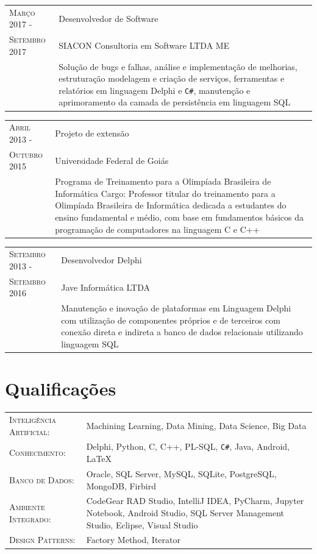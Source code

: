 \documentclass[12pt, oneside, openany, a4paper, english, brazil]{abntex2}
\begin{document}
\begin{tabular}{p{3.5cm}p{11cm}}
\textsc{Março 2017} - & Desenvolvedor de Software \\
\textsc{Setembro 2017} & SIACON Consultoria em Software LTDA ME \\ 
\textsc{} & Solução de bugs e falhas, análise e implementação de melhorias, estruturação modelagem e criação de serviços, ferramentas e relatórios em linguagem Delphi e \texttt{C\#}, manutenção e aprimoramento da camada de persistência em linguagem SQL
\end{tabular}                                    

\begin{tabular}{p{3.5cm}p{11cm}}
\textsc{Abril 2013} - & Projeto de extensão \\
\textsc{Outubro 2015} & Universidade Federal de Goiás \\
\textsc{} & Programa de Treinamento para a Olimpíada Brasileira de Informática Cargo: Professor titular do treinamento para a Olimpíada Brasileira de Informática dedicada a estudantes do ensino fundamental e médio, com base em fundamentos básicos da programação de computadores na linguagem C e C++
\end{tabular}

\begin{tabular}{p{3.5cm}p{11cm}}
\textsc{Setembro 2013} - & Desenvolvedor Delphi \\
\textsc{Setembro 2016} & Jave Informática LTDA \\ 
\textsc{} & Manutenção e inovação de plataformas em Linguagem Delphi com utilização de componentes próprios e de terceiros com conexão direta e indireta a banco de dados relacionais utilizando linguagem SQL
\end{tabular}


\section{Qualificações}


\begin{tabular}{p{5.5cm}p{9cm}}
\textsc{Inteligência Artificial:} & Machining Learning, Data Mining, Data Science, Big Data \\
\textsc{Conhecimento:} & Delphi, Python, C, C++, PL-SQL, \texttt{C\#}, Java, Android, \LaTeX \\
\textsc{Banco de Dados:} & Oracle, SQL Server, MySQL, SQLite, PostgreSQL, MongoDB, Firbird \\
\textsc{Ambiente Integrado:} & CodeGear RAD Studio, IntelliJ IDEA, PyCharm, Jupyter Notebook, Android Studio, SQL Server Management Studio, Eclipse, Visual Studio \\
\textsc{Design Patterns:} & Factory Method, Iterator \\
\end{tabular}
\end{document}
